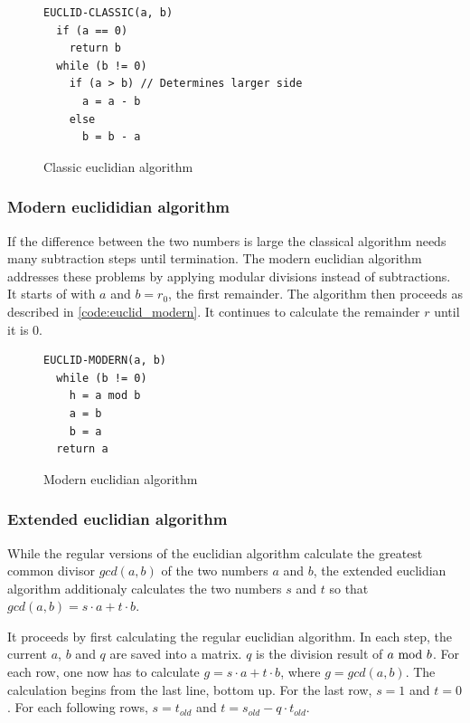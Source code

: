 \begin{figure}
\begin{lstlisting}
EUCLID-CLASSIC(a, b)
  if (a == 0)
    return b
  while (b != 0)
    if (a > b) // Determines larger side
      a = a - b
    else
      b = b - a
\end{lstlisting}
\caption{Classic euclidian algorithm}
\label{code:euclid_classic}
\end{figure}

\subsubsection{Modern euclididian algorithm}

If the difference between the two numbers is large the classical algorithm
needs many subtraction steps until termination. The modern euclidian algorithm
addresses these problems by applying modular divisions instead of subtractions.
It starts of with $a$ and $b = r_0$, the first remainder. The algorithm then
proceeds as described in \ref{code:euclid_modern}. It continues to
calculate the remainder $r$ until it is $0$.

\begin{figure}
\begin{lstlisting}
EUCLID-MODERN(a, b)
  while (b != 0)
    h = a mod b
    a = b
    b = a
  return a
\end{lstlisting}
\caption{Modern euclidian algorithm}
\label{code:euclid_classic}
\end{figure}

\subsubsection{Extended euclidian algorithm}

While the regular versions of the euclidian algorithm calculate the greatest
common divisor $gcd(a, b)$ of the two numbers $a$ and $b$, the extended
euclidian algorithm additionaly calculates the two numbers $s$ and $t$ so
that $gcd(a, b) = s \cdot a + t \cdot b$.

It proceeds by first calculating the regular euclidian algorithm. In each
step, the current $a$, $b$ and $q$ are saved into a matrix. $q$ is the division
result of $a \ \text{mod}\ b$. For each row, one now has to calculate
$g = s \cdot a + t \cdot b$, where $g = gcd(a, b)$. The calculation begins from
the last line, bottom up. For the last row, $s = 1$ and $t = 0$. For each
following rows, $s = t_{old}$ and $t = s_{old} - q \cdot t_{old}$.

